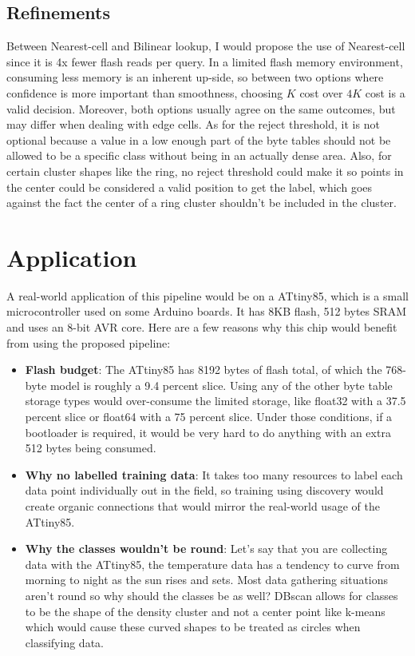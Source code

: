 \documentclass[10pt,a4paper,twocolumn]{article}
\begin{document}
\subsection{Refinements}
Between Nearest-cell and Bilinear lookup, I would propose the use of Nearest-cell since it is 4x fewer flash reads per query. In a limited flash memory environment, consuming less memory is an inherent up-side, so between two options where confidence is more important than smoothness, choosing $K$ cost over $4K$ cost is a valid decision. Moreover, both options usually agree on the same outcomes, but may differ when dealing with edge cells.
As for the reject threshold, it is not optional because a value in a low enough part of the byte tables should not be allowed to be a specific class without being in an actually dense area. Also, for certain cluster shapes like the ring, no reject threshold could make it so points in the center could be considered a valid position to get the label, which goes against the fact the center of a ring cluster shouldn't be included in the cluster.

\section{Application}
 
A real-world application of this pipeline would be on a ATtiny85, which is a small microcontroller used on some Arduino boards. It has 8KB flash, 512 bytes SRAM and uses an 8-bit AVR core. Here are a few reasons why this chip would benefit from using the proposed pipeline:
\begin{itemize}
  \item \textbf{Flash budget}: The ATtiny85 has
        8192 bytes of flash total, of which the 768-byte model is roughly a 9.4 percent slice. Using any of the other byte table storage types would over-consume the limited storage, like float32 with a 37.5 percent slice or float64 with a 75 percent slice. Under those conditions, if a bootloader is required, it would be very hard to do anything with an extra 512 bytes being consumed.
  \item \textbf{Why no labelled training data}: It  takes too many resources to label each data point individually out in the field, so training using discovery would create organic connections that would mirror the real-world usage of the ATtiny85.
  \item \textbf{Why the classes wouldn't be round}: Let's say that you are collecting data with the ATtiny85, the temperature data has a tendency to curve from morning to night as the sun rises and sets. Most data gathering situations aren't round so why should the classes be as well? DBscan allows for classes to be the shape of the density cluster and not a center point like k-means which would cause these curved shapes to be treated as circles when classifying data.
\end{itemize}
 
\end{document}
